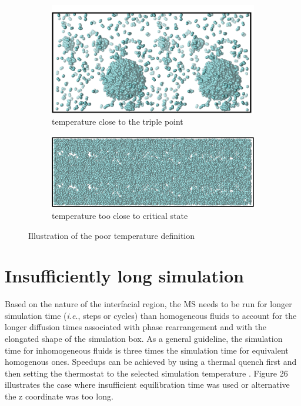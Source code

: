 \documentclass{scrbook}
\begin{document}
\begin{figure}
	\centering
	\begin{subfigure}{0.4\textwidth} %
    \includegraphics[width=1\textwidth]{gfx/image75.png}
    \caption{temperature close to the triple point}
	\end{subfigure}
	\begin{subfigure}{0.4\textwidth} %
    \includegraphics[width=1\textwidth]{gfx/image76.png}
    \caption{temperature too close to critical state}
	\end{subfigure}
\caption{Illustration of the poor temperature definition}
\label{fig:25}
\end{figure}

\section{Insufficiently long simulation} 

Based on the nature of the interfacial region, the MS needs to be run for
longer simulation time (\textit{i.e}., steps or cycles) than homogeneous fluids
to account for the longer diffusion times associated with phase rearrangement
and with the elongated shape of the simulation box. As a general guideline, the
simulation time for inhomogeneous fluids is three times the simulation time for
equivalent homogenous ones. Speedups can be achieved by using a thermal quench
first and then setting the thermostat to the selected simulation temperature
\citep{gelb2002}. Figure 26 illustrates the case where insufficient equilibration time was
used or alternative the z coordinate was too long.
\end{document}
